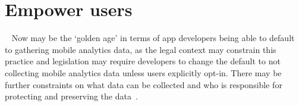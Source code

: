 \afterpage{\clearpage}

\section{Empower users}~\label{discussion-empower-users}
Now may be the ‘golden age’ in terms of app developers being able to default to gathering mobile analytics data, as the legal context may constrain this practice and legislation may require developers to change the default to not collecting mobile analytics data unless users explicitly opt-in. There may be further constraints on what data can be collected and who is responsible for protecting and preserving the data~. 

